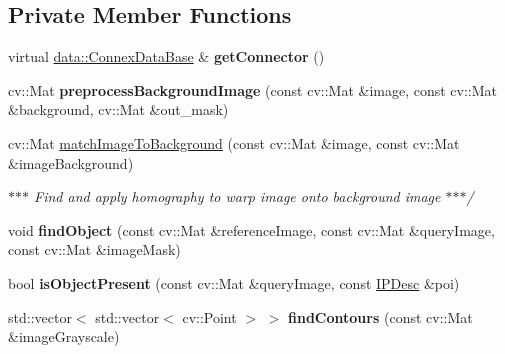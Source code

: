 \subsection*{Private Member Functions}
\begin{DoxyCompactItemize}
\item 
\mbox{\label{classfilter_1_1algos_1_1_p_p_o_c_aba37bb29b72256cadda20a972678a080}} 
virtual \hyperlink{classfilter_1_1data_1_1_connex_data_base}{data\+::\+Connex\+Data\+Base} \& {\bfseries get\+Connector} ()
\item 
\mbox{\label{classfilter_1_1algos_1_1_p_p_o_c_a487599d91d43c9c2a724f833efa8d915}} 
cv\+::\+Mat {\bfseries preprocess\+Background\+Image} (const cv\+::\+Mat \&image, const cv\+::\+Mat \&background, cv\+::\+Mat \&out\+\_\+mask)
\item 
\mbox{\label{classfilter_1_1algos_1_1_p_p_o_c_ac81551a402b0e77af07f3cb47563b430}} 
cv\+::\+Mat \hyperlink{classfilter_1_1algos_1_1_p_p_o_c_ac81551a402b0e77af07f3cb47563b430}{match\+Image\+To\+Background} (const cv\+::\+Mat \&image, const cv\+::\+Mat \&image\+Background)
\begin{DoxyCompactList}\small\item\em $\ast$$\ast$$\ast$ Find and apply homography to warp image onto background image $\ast$$\ast$$\ast$/ \end{DoxyCompactList}\item 
\mbox{\label{classfilter_1_1algos_1_1_p_p_o_c_ac75c7aec1f4c33328240f95a89948e05}} 
void {\bfseries find\+Object} (const cv\+::\+Mat \&reference\+Image, const cv\+::\+Mat \&query\+Image, const cv\+::\+Mat \&image\+Mask)
\item 
\mbox{\label{classfilter_1_1algos_1_1_p_p_o_c_a04dc0fd040af169e507ae08839b18722}} 
bool {\bfseries is\+Object\+Present} (const cv\+::\+Mat \&query\+Image, const \hyperlink{classfilter_1_1algos_1_1_i_p_desc}{I\+P\+Desc} \&poi)
\item 
\mbox{\label{classfilter_1_1algos_1_1_p_p_o_c_a42f16ee849831d5fe9a8c9314c413795}} 
std\+::vector$<$ std\+::vector$<$ cv\+::\+Point $>$ $>$ {\bfseries find\+Contours} (const cv\+::\+Mat \&image\+Grayscale)

\end{DoxyCompactItemize}
